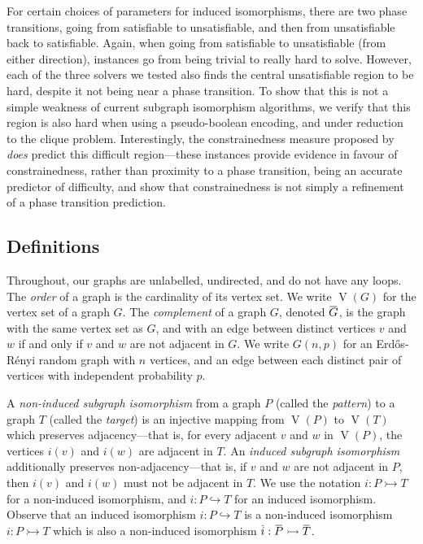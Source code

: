 \documentclass[letterpaper]{article}
\newcommand{\citet}[1]{\citeauthor{#1} \shortcite{#1}}
\newcommand{\shortoverline}[1]{\mkern 1.5mu\overline{\mkern-1.5mu#1\mkern-1.5mu}\mkern 1.5mu}
\begin{document}
For certain choices of parameters for induced isomorphisms, there are two phase transitions, going
from satisfiable to unsatisfiable, and then from unsatisfiable back to satisfiable. Again, when
going from satisfiable to unsatisfiable (from either direction), instances go from being trivial to
really hard to solve. However, each of the three solvers we tested also finds the central
unsatisfiable region to be hard, despite it not being near a phase transition. To show that this is
not a simple weakness of current subgraph isomorphism algorithms, we verify that this region is also
hard when using a pseudo-boolean encoding, and under reduction to the clique problem. Interestingly,
the constrainedness measure proposed by \citet{Gent:1996:Kappa} \emph{does} predict this difficult
region---these instances provide evidence in favour of constrainedness, rather than proximity to a
phase transition, being an accurate predictor of difficulty, and show that constrainedness is not
simply a refinement of a phase transition prediction.

\subsection{Definitions}

Throughout, our graphs are unlabelled, undirected, and do not have any loops.  The \emph{order} of a
graph is the cardinality of its vertex set. We write $\operatorname{V}(G)$ for the vertex set of a
graph $G$. The \emph{complement} of a graph $G$, denoted $\shortoverline{G}$, is the graph with the
same vertex set as $G$, and with an edge between distinct vertices $v$ and $w$ if and only if $v$
and $w$ are not adjacent in $G$. We write $G(n, p)$ for an Erd\H{o}s-R\'enyi random graph with $n$
vertices, and an edge between each distinct pair of vertices with independent probability $p$.

A \emph{non-induced subgraph isomorphism} from a graph $P$ (called the \emph{pattern}) to a graph
$T$ (called the \emph{target}) is an injective mapping from $\operatorname{V}(P)$ to
$\operatorname{V}(T)$ which preserves adjacency---that is, for every adjacent $v$ and $w$ in
$\operatorname{V}(P)$, the vertices $i(v)$ and $i(w)$ are adjacent in $T$. An \emph{induced subgraph
isomorphism} additionally preserves non-adjacency---that is, if $v$ and $w$ are not adjacent in $P$,
then $i(v)$ and $i(w)$ must not be adjacent in $T$. We use the notation $i : P \rightarrowtail T$
for a non-induced isomorphism, and $i : P \hookrightarrow T$ for an induced isomorphism. Observe
that an induced isomorphism $i : P \hookrightarrow T$ is a non-induced isomorphism $i : P
\rightarrowtail T$ which is also a non-induced isomorphism $\shortoverline{i} : \shortoverline{P}
\rightarrowtail \shortoverline{T}$.
\end{document}
